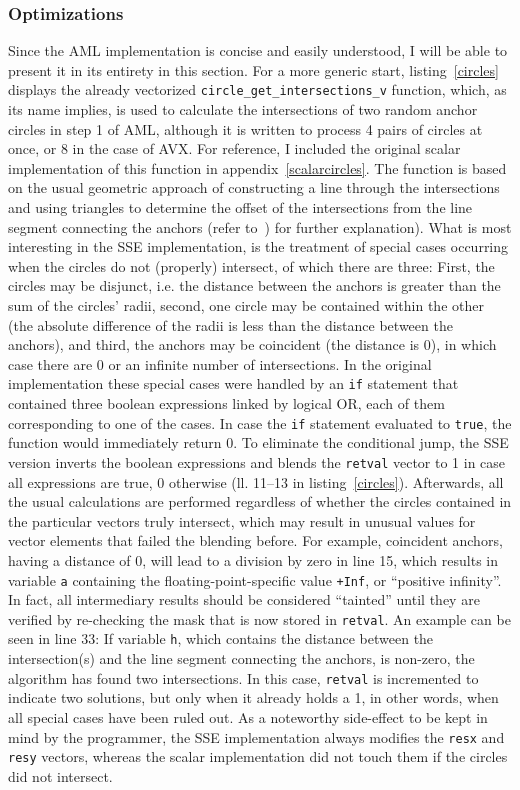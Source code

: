 \subsubsection{Optimizations}
Since the AML implementation is concise and easily understood, I will be able to present it in its entirety in this section. For a more generic start, listing~\ref{circles} displays the already vectorized \texttt{circle\_get\_intersections\_v} function, which, as its name implies, is used to calculate the intersections of two random anchor circles in step 1 of AML, although it is written to process 4 pairs of circles at once, or 8 in the case of AVX. For reference, I included the original scalar implementation of this function in appendix~\ref{scalarcircles}. The function is based on the usual geometric approach of constructing a line through the intersections and using triangles to determine the offset of the intersections from the line segment connecting the anchors (refer to~\cite{bourke1997circles}) for further explanation). What is most interesting in the SSE implementation, is the treatment of special cases occurring when the circles do not (properly) intersect, of which there are three: First, the circles may be disjunct, i.e. the distance between the anchors is greater than the sum of the circles' radii, second, one circle may be contained within the other (the absolute difference of the radii is less than the distance between the anchors), and third, the anchors may be coincident (the distance is 0), in which case there are 0 or an infinite number of intersections. In the original implementation these special cases were handled by an \texttt{if} statement that contained three boolean expressions linked by logical OR, each of them corresponding to one of the cases. In case the \texttt{if} statement evaluated to \texttt{true}, the function would immediately return 0. To eliminate the conditional jump, the SSE version inverts the boolean expressions and blends the \texttt{retval} vector to 1 in case all expressions are true, 0 otherwise (ll. 11--13 in listing~\ref{circles}). Afterwards, all the usual calculations are performed regardless of whether the circles contained in the particular vectors truly intersect, which may result in unusual values for vector elements that failed the blending before. For example, coincident anchors, having a distance of 0, will lead to a division by zero in line 15, which results in variable \texttt{a} containing the floating-point-specific value \texttt{+Inf}, or ``positive infinity''. In fact, all intermediary results should be considered ``tainted'' until they are verified by re-checking the mask that is now stored in \texttt{retval}. An example can be seen in line 33: If variable \texttt{h}, which contains the distance between the intersection(s) and the line segment connecting the anchors, is non-zero, the algorithm has found two intersections. In this case, \texttt{retval} is incremented to indicate two solutions, but only when it already holds a 1, in other words, when all special cases have been ruled out. As a noteworthy side-effect to be kept in mind by the programmer, the SSE implementation always modifies the \texttt{resx} and \texttt{resy} vectors, whereas the scalar implementation did not touch them if the circles did not intersect.

